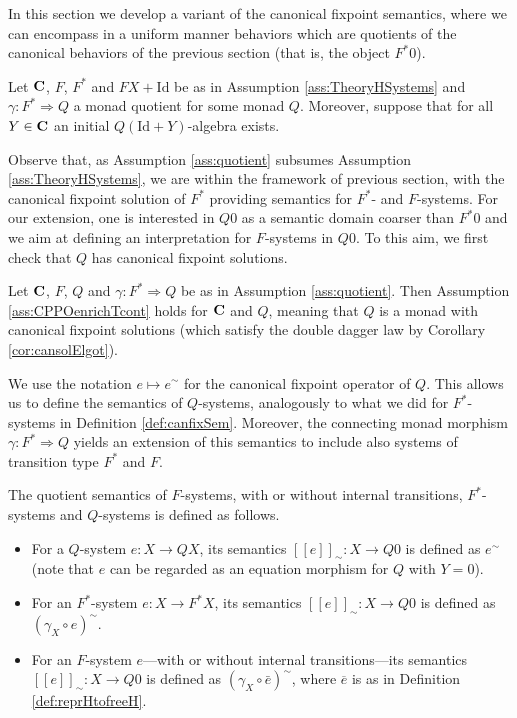 \documentclass[oribibl,envcountsame,envcountsect,runningheads]{llncs}
\newcommand{\free}[1]{{#1^*}}
\renewcommand{\>}{\rangle}
\newcommand{\bb}[1]{[\![ #1 ]\!]}
\def\Id{\mathrm{Id}}
\def\quotsol#1{{#1}^{\sim}}
\newcommand{\bbq}[1]{\bb{#1}_{\sim}}
\def\To{\Rightarrow}
\def\GF{F} \def\GFG{G} \def\MM{R} \def\quot{\xi} \def\quotG{\gamma}
\begin{document}
In this section we develop a variant of the canonical fixpoint semantics, where we can encompass in a uniform manner behaviors which are quotients of the canonical behaviors of the previous section (that is, the object $\free{\GF }0$).
\begin{assumption}\label{ass:quotient} Let $\mathbf{C}$, $\GF $, $\free{\GF }$ and $\GF X+\Id$ be as in Assumption \ref{ass:TheoryHSystems} and $\quotG \colon\free{\GF }\To Q$ a monad quotient for some monad $Q$. Moreover, suppose that for all $Y \in \mathbf{C}$ an initial $Q(\Id +Y)$-algebra exists.
\end{assumption}
Observe that, as Assumption \ref{ass:quotient} subsumes Assumption \ref{ass:TheoryHSystems}, we are within the framework of previous section, with the canonical fixpoint solution of $\free{\GF }$ providing semantics for $\free{\GF }$- and $\GF $-systems. For our extension, one is interested in $Q0$ as a semantic domain coarser than $\free{\GF }0$ and we aim at defining an interpretation for $\GF $-systems in $Q0$. To this aim, we first check that $Q$ has canonical fixpoint solutions.
\newcommand{\propQElgot}{Let $\C$, $\GF $, $Q$ and $\quotG : \free{\GF } \To Q$ be as in Assumption \ref{ass:quotient}. Then Assumption \ref{ass:CPPOenrichTcont} holds for $\C$ and $Q$, meaning that $Q$ is a monad with canonical fixpoint solutions (which satisfy the double dagger law by Corollary \ref{cor:cansolElgot}).}
\begin{proposition}\label{prop:QElgot}
\propQElgot
\end{proposition}
We use the notation $e \mapsto \quotsol e$ for the canonical fixpoint operator of $Q$. This allows us to define the semantics of $Q$-systems, analogously to what we did for $\free{\GF }$-systems in Definition \ref{def:canfixSem}. Moreover, the connecting monad morphism $\quotG \colon \free{\GF } \To Q$ yields an extension of this semantics to include also systems of transition type $\free{\GF }$ and $\GF $.
\begin{definition} \label{def:quotSem}
The quotient semantics of $\GF $-systems, with or without internal transitions, $\free{\GF }$-systems and $Q$-systems is defined as follows.
\begin{itemize}
  \item For a $Q$-system $e \colon X \to QX$, its semantics $\bbq{e} \colon X \to Q0$ is defined as $\quotsol{e}$ (note that $e$ can be regarded as an equation morphism for $Q$ with $Y=0$).
\item For an $\free{\GF }$-system $e\colon X \to \free{\GF }X$, its semantics $\bbq{e}\colon X \to Q0$ is defined as $\quotsol {(\quotG_X \circ e)}$.
\item For an $\GF $-system $e$---with or without internal transitions---its semantics $\bbq{e}\colon X \to Q0 $ is defined as $\quotsol {(\quotG_X \circ \bar{e})}$, where $\overline{e}$ is as in Definition \ref{def:reprHtofreeH}.
\end{itemize}
\end{definition}
\end{document}
